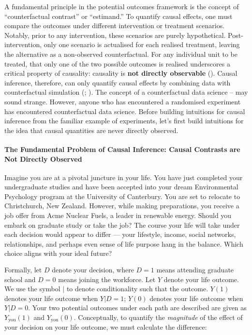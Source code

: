 \documentclass[
  singlecolumn]{article}
\let\oldparagraph\paragraph
\renewcommand{\paragraph}[1]{\oldparagraph{#1}\mbox{}}
\begin{document}
A fundamental principle in the potential outcomes framework is the
concept of ``counterfactual contrast'' or ``estimand.'' To quantify
causal effects, one must compare the outcomes under different
intervention or treatment scenarios. Notably, prior to any intervention,
these scenarios are purely hypothetical. Post-intervention, only one
scenario is actualised for each realised treatment, leaving the
alternative as a non-observed counterfactual. For any individual unit to
be treated, that only one of the two possible outcomes is realised
underscores a critical property of causality: causality is \textbf{not
directly observable} (). Causal
inference, therefore, can only quantify causal effects by combining data
with counterfactual simulation (; ). The concept of a counterfactual data science -- may sound
strange. However, anyone who has encountered a randomised experiment has
encountered counterfactual data science. Before building intuitions for
causal inference from the familiar example of experiments, let's first
build intuitions for the idea that causal quantities are never directly
observed.

\paragraph{The Fundamental Problem of Causal Inference: Causal Contrasts
are Not Directly
Observed}\label{the-fundamental-problem-of-causal-inference-causal-contrasts-are-not-directly-observed}

Imagine you are at a pivotal juncture in your life. You have just
completed your undergraduate studies and have been accepted into your
dream Environmental Psychology program at the University of Canterbury.
You are set to relocate to Christchurch, New Zealand. However, while
making preparations, you receive a job offer from Acme Nuclear Fuels, a
leader in renewable energy. Should you embark on graduate study or take
the job? The course your life will take under each decision would appear
to differ --- your lifestyle, income, social networks, relationships,
and perhaps even sense of life purpose hang in the balance. Which choice
aligns with your ideal future?

Formally, let \(D\) denote your decision, where \(D = 1\) means
attending graduate school and \(D = 0\) means joining the workforce. Let
\(Y\) denote your life outcome. We use the symbol \(|\) to denote
conditionality such that the outcome. \(Y(1)\) denotes your life outcome
when \(Y|D=1\); \(Y(0)\) denotes your life outcome when \(Y|D=0\). Your
two potential outcomes under each path are described are given as
\(Y_{\text{you}}(1)\) and \(Y_{\text{you}}(0)\). Conceptually, to
quantify the \emph{magnitude} of the effect of your decision on your
life outcome, we must calculate the difference:
\end{document}
